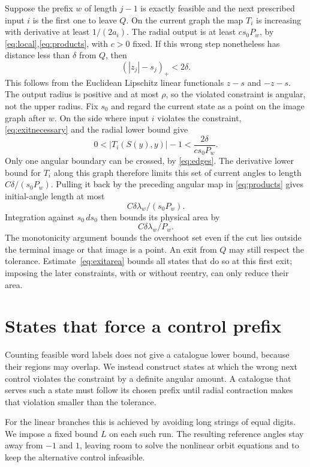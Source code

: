 \documentclass[11pt]{amsart}
\theoremstyle{definition}
\theoremstyle{remark}
\numberwithin{equation}{section}
\begin{document}
Suppose the prefix \(w\) of length \(j-1\) is exactly feasible and
the next prescribed input \(i\) is the first one to leave $Q$.
On the current graph the map \(T_i\) is increasing with derivative
at least \(1/(2a_i)\). The radial output is at least
\(c s_0P_w\), by \eqref{eq:local},\eqref{eq:products}, with \(c>0\) fixed.
If this wrong step nonetheless has distance less than \(\delta\)
from $Q$, then
\begin{equation}
(|z_j|-s_j)_+<2\delta.                    \label{eq:exitnecessary}
\end{equation}
This follows from the Euclidean Lipschitz linear functionals
\(z-s\) and \(-z-s\). The output radius is positive and at most
\(\rho\), so the violated constraint is angular, not the upper radius.
Fix $s_0$ and regard the current state as a point on the image
graph after $w$. On the side where input $i$ violates the constraint,
\eqref{eq:exitnecessary} and the radial lower bound give
\[
0<|T_i(S(y),y)|-1<\frac{2\delta}{c s_0P_w}.
\]
Only one angular boundary can be crossed, by \eqref{eq:edges}.
The derivative lower bound for $T_i$ along this graph therefore
limits this set of current angles to length
$C\delta/(s_0P_w)$. Pulling it back by the preceding angular map
in \eqref{eq:products} gives initial-angle length at most
\[
                         C\delta\lambda_w/(s_0P_w).
\]
Integration against \(s_0\,ds_0\) then bounds its physical area by
\begin{equation}
C\delta\lambda_w/P_w.     \label{eq:exitarea}
\end{equation}
The monotonicity argument bounds the overshoot set even if the
cut lies outside the terminal image or that image is a point.
An exit from $Q$ may still respect the tolerance. Estimate~\eqref{eq:exitarea}
bounds all states that do so at this first exit; imposing the later
constraints, with or without reentry, can only reduce their area.
\section{States that force a control prefix}\label{sec:shadow}
Counting feasible word labels does not give a catalogue lower
bound, because their regions may overlap. We instead
construct states at which the wrong next control violates the
constraint by a definite angular amount. A catalogue that serves
such a state must follow its chosen prefix until radial contraction
makes that violation smaller than the tolerance.

For the linear branches this is achieved by avoiding long strings
of equal digits. We impose a fixed bound $L$ on each such run.
The resulting reference angles stay away from $-1$ and $1$,
leaving room to solve the nonlinear orbit equations and to keep
the alternative control infeasible.
\end{document}
